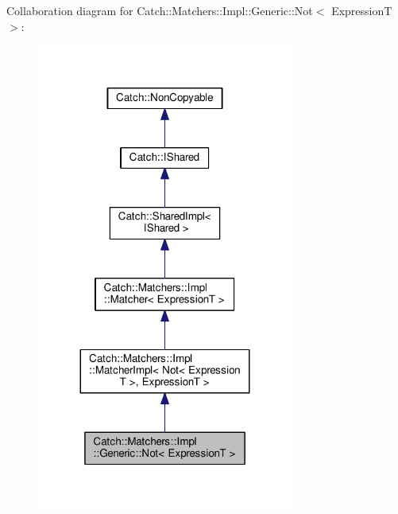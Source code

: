 Collaboration diagram for Catch\+:\+:Matchers\+:\+:Impl\+:\+:Generic\+:\+:Not$<$ ExpressionT $>$\+:
\nopagebreak
\begin{figure}[H]
\begin{center}
\leavevmode
\includegraphics[width=239pt]{classCatch_1_1Matchers_1_1Impl_1_1Generic_1_1Not__coll__graph}
\end{center}
\end{figure}
